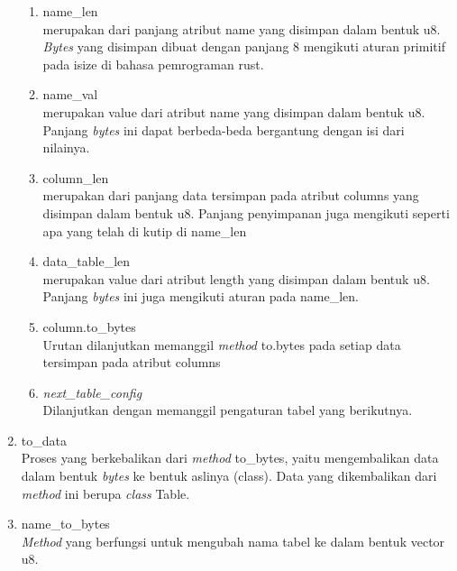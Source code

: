 \begin{enumerate}
	\begin{enumerate}
		\item name\_len \\
		merupakan dari panjang atribut name yang disimpan dalam bentuk u8. \emph{Bytes} yang disimpan dibuat dengan panjang 8 mengikuti aturan primitif pada isize di bahasa pemrograman rust.

		\item name\_val \\
		merupakan value dari atribut name yang disimpan dalam bentuk u8. Panjang \emph{bytes} ini dapat berbeda-beda bergantung dengan isi dari nilainya. 

		\item column\_len \\
		merupakan dari panjang data tersimpan pada atribut columns yang disimpan dalam bentuk u8. Panjang penyimpanan juga mengikuti seperti apa yang telah di kutip di name\_len

		\item data\_table\_len \\
		merupakan value dari atribut length yang disimpan dalam bentuk u8. Panjang \emph{bytes} ini juga mengikuti aturan pada name\_len. 

		\item column.to\_bytes \\
		Urutan dilanjutkan memanggil \emph{method} to.bytes pada setiap data tersimpan pada atribut columns

		\item \emph{next\_table\_config} \\
		Dilanjutkan dengan memanggil pengaturan tabel yang berikutnya.
	\end{enumerate}

	\item to\_data \\
  Proses yang berkebalikan dari \emph{method} to\_bytes, yaitu mengembalikan data dalam bentuk \emph{bytes} ke bentuk aslinya (class). Data yang dikembalikan dari \emph{method} ini 
  berupa \emph{class} Table.
  
	\item name\_to\_bytes \\
  \emph{Method} yang berfungsi untuk mengubah nama tabel ke dalam bentuk vector u8.
\end{enumerate}

